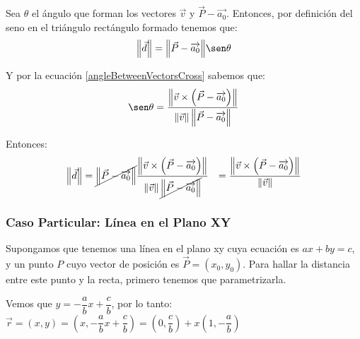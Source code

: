 \documentclass[12pt, fleqn]{report}                             %
\theoremstyle{break}                                            %
\newcommand{\Wrap}[1]{\left( #1 \right)}                        %
\newcommand{\Abs}[1]{\left\lVert #1 \right\lVert}               %
\newcommand{\lVec}[1]{\overrightarrow{#1}}                      %
\begin{document}
                Sea $\theta$ el ángulo que forman los vectores $\vec{v}$ y $\vec{P} - \lVec{a_0}$.
                Entonces, por definición del seno en el triángulo rectángulo formado tenemos que:
                \begin{align}
                    \Abs{\vec{d}} = {\Abs{\vec{P} - \lVec{a_0}}} \sen \theta
                \end{align}
                
                Y por la ecuación \ref{angleBetweenVectorsCross} sabemos que:
                \begin{align}
                    \sen \theta = \dfrac
                                    {\Abs{\vec{v} \times \Wrap{\vec{P} - \lVec{a_0}}}   }
                                    {\Abs{\vec{v}} \Abs{\vec{P} - \lVec{a_0}}           }
                \end{align}
                
                Entonces:
                \begin{align}
                    \Abs{\vec{d}} 
                        &= \cancel{\Abs{\vec{P} - \lVec{a_0}}} 
                            \dfrac{\Abs{\vec{v} \times \Wrap{\vec{P} - \lVec{a_0}}}}{\Abs{\vec{v}}
                            \cancel{\Abs{\vec{P} - \lVec{a_0}}}} 
                        &= \dfrac{\Abs{\vec{v} \times \Wrap{\vec{P} - \lVec{a_0}}}}{\Abs{\vec{v}}} 
                    \label{distancePointLine2}
                \end{align}


                \clearpage
                \subsubsection{Caso Particular: Línea en el Plano XY}

                    Supongamos que tenemos una línea en el plano xy cuya ecuación es $ax + by = c$,
                    y un punto $P$ cuyo vector de posición es $\vec{P} = (x_0, y_0)$.
                    Para hallar la distancia entre este punto y la recta, primero tenemos que parametrizarla.
                    
                    Vemos que $y = -\dfrac{a}{b}x+\dfrac{c}{b}$, por lo tanto: 
                    $\vec{r} 
                        = (x, y) = \Wrap{x, -\dfrac{a}{b}x+\dfrac{c}{b}}
                        = \Wrap{0, \dfrac{c}{b}} + x\Wrap{1, -\dfrac{a}{b}}$
\end{document}
